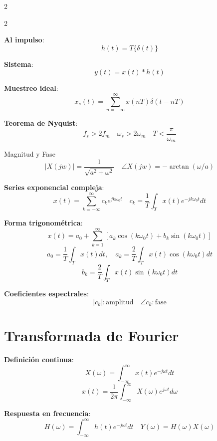 \documentclass{article}
\begin{document}
\begin{multicols}{2}
\begin{multicols}{2}
  \begin{itemform}
\item \textbf{Al impulso}:
$$h(t) = T\{\delta(t)\} $$

\columnbreak
\item \textbf{Sistema}:
$$y(t) = x(t) * h(t) $$
\end{itemform}
\end{multicols}

\begin{itemform}
\item \textbf{Muestreo ideal}:
$$x_s(t) = \sum_{n=-\infty}^{\infty} x(nT)\delta(t-nT)$$
\item \textbf{Teorema de Nyquist}:
$$f_s > 2f_m \quad \omega_s > 2\omega_m \quad T < \frac{\pi}{\omega_m}$$
\end{itemform}

\begin{itemform}
\item Magnitud y Fase
$$|X(jw)|= \dfrac{1}{\sqrt{a^2+\omega^2}} \quad \angle X(jw)=-\arctan(\omega/a)$$
\item \textbf{Series exponencial compleja}:
$$x(t) = \sum_{k=-\infty}^{\infty} c_k e^{jk\omega_0 t} \quad c_k = \frac{1}{T} \int_T x(t)e^{-jk\omega_0 t}dt$$
\item \textbf{Forma trigonométrica}:
$$x(t) = a_0 + \sum_{k=1}^{\infty} [a_k\cos(k\omega_0 t) + b_k\sin(k\omega_0 t)]$$
$$a_0 = \frac{1}{T} \int_T x(t)dt, \quad a_k = \frac{2}{T} \int_T x(t)\cos(k\omega_0 t)dt$$
$$b_k = \frac{2}{T} \int_T x(t)\sin(k\omega_0 t)dt$$
\item \textbf{Coeficientes espectrales}:
$$|c_k|: \text{amplitud} \quad \angle c_k: \text{fase}$$
\end{itemform}

\section{Transformada de Fourier}
\begin{itemform}
\item \textbf{Definición continua}:
$$X(\omega) = \int_{-\infty}^{\infty} x(t)e^{-j\omega t}dt$$
$$x(t) = \frac{1}{2\pi} \int_{-\infty}^{\infty} X(\omega)e^{j\omega t}d\omega$$
\item \textbf{Respuesta en frecuencia}:
$$H(\omega) = \int_{-\infty}^{\infty} h(t)e^{-j\omega t}dt \quad Y(\omega) = H(\omega)X(\omega)$$


\end{itemform}
\end{multicols}
\end{document}
